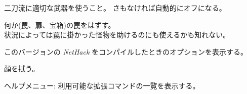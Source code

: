 二刀流に適切な武器を使うこと。
さもなければ自動的にオフになる。
\item[\tb{\#untrap}]
何か(罠、扉、宝箱)の罠をはずす。\\
状況によっては罠に掛かった怪物を助けるのにも使えるかも知れない。
\item[\tb{\#version}]
このバージョンの {\it NetHack\/} をコンパイルしたときのオプションを表示する。
\item[\tb{\#wipe}]
顔を拭う。
\item[\tb{\#?}]
ヘルプメニュー: 利用可能な拡張コマンドの一覧を表示する。
\elist

